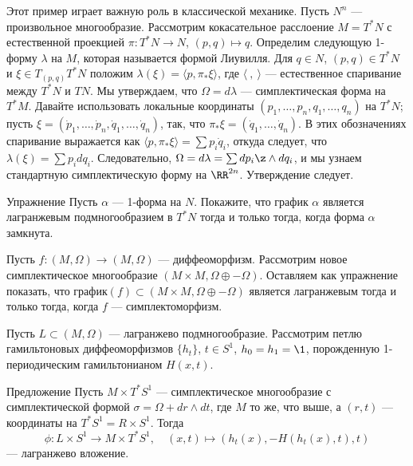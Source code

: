 Этот пример играет важную роль в классической механике.
Пусть $N^n$ --- произвольное многообразие.
Рассмотрим кокасательное расслоение $M = T^\ast N$ с естественной проекцией $\pi\colon T^\ast N \to N$, $(p, q) \mapsto q$.
Определим следующую 1-форму $\lambda$ на $M$, которая называется формой Лиувилля.
Для $q \in N$, $(p, q) \in T^\ast N$ и $\xi \in T_{(p, q)} T^\ast N$ положим $\lambda (\xi) = \langle p, \pi_\ast \xi \rangle$, где $\langle\ ,\ \rangle$ --- естественное спаривание между $T^\ast N$ и $TN$.
Мы утверждаем, что $\Omega = d\lambda$ --- симплектическая форма на $T^\ast M$.
Давайте использовать локальные координаты $(p_1,\dots, p_n, q_1,\dots, q_n)$ на $T^\ast N$; пусть $\xi = (\dot p_1 ,\dots, \dot p_n, \dot q_1,\dots,\dot q_n)$, так, что $\pi_\ast \xi = (\dot q_1,\dots, \dot q_n)$.
В этих обозначениях спаривание выражается как $\langle p, \pi_\ast \xi\rangle =\sum p_i \dot q_i$, откуда следует, что $\lambda (\xi) =\sum p_i dq_i$.
Следовательно, $\Omega = d\lambda =\sum dp_i \z\wedge dq_i$, и мы узнаем стандартную симплектическую форму на $\RR^{2n}$.
Утверждение следует.

\begin{thm*}{Упражнение}
Пусть $\alpha$ --- 1-форма на $N$.
Покажите, что график $\alpha$ является лагранжевым подмногообразием в $T^\ast N$ тогда и только тогда, когда форма $\alpha$ замкнута.
\end{thm*}

\begin{thm}{}\label{3.1.D}
\end{thm}

Пусть $f\colon (M, \Omega) \to (M, \Omega)$ --- диффеоморфизм.
Рассмотрим новое симплектическое многообразие $(M \times M, \Omega \oplus -\Omega)$.
Оставляем как упражнение показать, что график$(f) \subset (M \times M, \Omega \oplus -\Omega)$ является лагранжевым тогда и только тогда, когда $f$ --- симплектоморфизм.


\begin{thm}{}\label{3.1.E}
\end{thm}

Пусть $L \subset (M, \Omega)$ --- лагранжево подмногообразие.
Рассмотрим петлю гамильтоновых диффеоморфизмов $\{h_t\}$, $t \in S^1$, $h_0 = h_1 = \1$, порожденную 1-периодическим гамильтонианом $H (x, t)$.


\begin{thm*}{Предложение}
Пусть $M \times T^\ast S^1$ --- симплектическое многообразие с симплектической формой $\sigma = \Omega + dr \wedge dt$, где $M$ то же, что выше, а $(r, t)$ --- координаты на $T^\ast S^1 = R \times S^1$.
Тогда
\[\phi: L \times S^1 \to M \times T^\ast S^1,
\quad
(x, t) \mapsto (h_t (x), -H (h_t (x), t), t)\]
--- лагранжево вложение.
\end{thm*}

